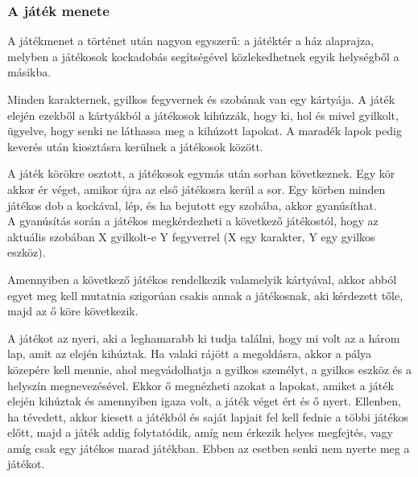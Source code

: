 \subsubsection{A játék menete}
A játékmenet a történet után nagyon egyszerű: a játéktér a ház alaprajza, melyben
a játékosok kockadobás segítségével közlekedhetnek egyik helységből a másikba.

Minden karakternek, gyilkos fegyvernek és szobának van egy kártyája. A játék elején
ezekből a kártyákból a játékosok kihúzzák, hogy ki, hol és mivel gyilkolt, ügyelve,
hogy senki ne láthassa meg a kihúzott lapokat. A maradék lapok pedig keverés után
kiosztásra kerülnek a játékosok között.

A játék körökre osztott, a játékosok egymás után sorban következnek. Egy kör akkor
ér véget, amikor újra az első játékosra kerül a sor. Egy körben minden játékos
dob a kockával, lép, és ha bejutott egy szobába, akkor gyanúsíthat.\\
A gyanúsítás során a játékos megkérdezheti a következő játékostól, hogy az
aktuális szobában X gyilkolt-e Y fegyverrel (X egy karakter, Y egy gyilkos eszköz).

Amennyiben a következő játékos rendelkezik valamelyik kártyával, akkor abból egyet
meg kell mutatnia szigorúan csakis annak a játékosnak, aki kérdezett tőle, majd
az ő köre következik.

A játékot az nyeri, aki a leghamarabb ki tudja találni, hogy mi volt az a három
lap, amit az elején kihúztak. Ha valaki rájött a megoldásra, akkor a pálya közepére
kell mennie, ahol megvádolhatja a gyilkos személyt, a gyilkos eszköz és a helyszín
megnevezésével. Ekkor ő megnézheti azokat a lapokat, amiket a játék elején kihúztak
és amennyiben igaza volt, a játék véget ért és ő nyert. Ellenben, ha tévedett,
akkor kiesett a játékból és saját lapjait fel kell fednie a többi játékos előtt,
majd a játék addig folytatódik, amíg nem érkezik helyes megfejtés, vagy amíg csak
egy játékos marad játékban. Ebben az esetben senki nem nyerte meg a játékot.

\clearpage
